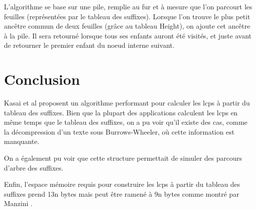 \documentclass[a4paper,10pt]{article}
\begin{document}
L'algorithme se base sur une pile, remplie au fur et à mesure que l'on
parcourt les feuilles (représentées par le tableau des
suffixes). Lorsque l'on trouve le plus petit ancêtre commun de deux
feuilles (grâce au tableau Height), on ajoute cet ancêtre à la
pile. Il sera retourné lorsque tous ses enfants auront été visités, et
juste avant de retourner le premier enfant du noeud interne suivant.




\section{Conclusion}
\label{sec:conclusion}


Kasai et al proposent un algorithme performant pour calculer les lcps
à partir du tableau des suffixes. Bien que la plupart des applications
calculent les lcps en même temps que le tableau des suffixes, on a pu
voir qu'il existe des cas, comme la décompression d'un texte sous
Burrows-Wheeler, où cette information est manquante.

On a également pu voir que cette structure permettait de simuler des
parcours d'arbre des suffixes.

Enfin, l'espace mémoire requis pour construire les lcps à partir du
tableau des suffixes prend 13n bytes mais peut être ramené à 9n bytes
comme montré par Manzini \cite{Manzini04}.




\end{document}
